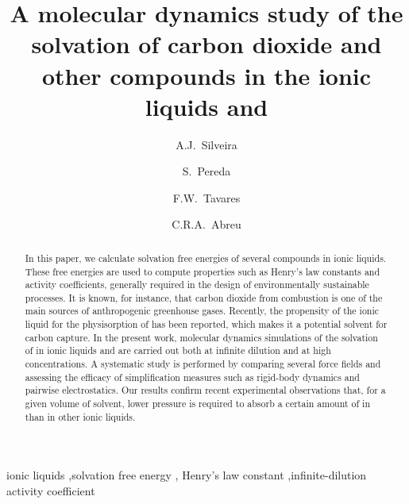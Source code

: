 \documentclass[3p,twocolumn]{elsarticle}
\begin{document}
\begin{frontmatter}

\title{A molecular dynamics study of the solvation of carbon dioxide and other compounds in the ionic liquids \ce{[emim][B(CN)_4]} and \ce{[emim][NTf_2]}}

\author[plapiqui]{A.J.~Silveira}
\author[plapiqui]{S.~Pereda}
\author[eq-ufrj,coppe-ufrj]{F.W.~Tavares}
\author[eq-ufrj]{C.R.A.~Abreu}

\address[plapiqui]{Planta Piloto de Ingenier\'ia Qu\'imica (PLAPIQUI), Universidad Nacional del Sur, Bah\'ia Blanca, Argentina}
\address[eq-ufrj]{Chemical Engineering Department, Escola de Qu\'imica, Universidade Federal do Rio de Janeiro, Rio de Janeiro, Brazil}
\address[coppe-ufrj]{Chemical Engineering Program, Alberto Luiz Coimbra Institute for Graduate Studies and Research in Engineering (COPPE), Universidade Federal do Rio de Janeiro, Rio de Janeiro, Brazil}


\begin{abstract}
In this paper, we calculate solvation free energies of several compounds in ionic liquids.
These free energies are used to compute properties such as Henry's law constants and activity coefficients, generally required in the design of environmentally sustainable processes.
It is known, for instance, that carbon dioxide from combustion is one of the main sources of anthropogenic greenhouse gases.
Recently, the propensity of the ionic liquid \ce{[emim][B(CN)_4]} for the physisorption of  has been reported, which makes it a potential solvent for carbon capture.
In the present work, molecular dynamics simulations of the solvation of  in ionic liquids \ce{[emim][B(CN)_4]} and \ce{[emim][NTf_2]} are carried out both at infinite dilution and at high concentrations.
A systematic study is performed by comparing several force fields and assessing the efficacy of simplification measures such as rigid-body dynamics and pairwise electrostatics.
Our results confirm recent experimental observations that, for a given volume of solvent, lower pressure is required to absorb a certain amount of  in \ce{[emim][B(CN)_4]} than in other ionic liquids.
\end{abstract}

\begin{keyword}
ionic liquids \sep solvation free energy \sep {} Henry's law constant \sep infinite-dilution activity coefficient
\end{keyword}

\end{frontmatter}
\end{document}
